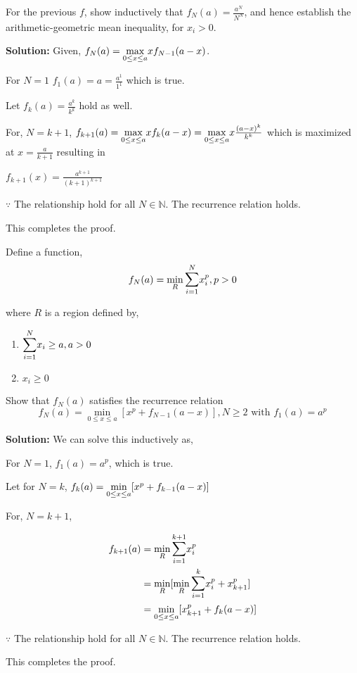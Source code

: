 \begin{example} For the previous $f$, show inductively that $f_N(a) = \frac{a^N}{N^N}$, and hence establish the arithmetic-geometric mean inequality, for $x_i > 0$.

\vspace{5mm}
\textbf{Solution:} Given, $f_N(a) = \mathlarger{\max_{0 \le x \le a}} xf_{N-1}(a-x)$.

For $N=1$ $f_1(a) = a = \frac{a^1}{1^1}$ which is true.

Let $f_k(a) = \frac{a^k}{k^k}$ hold as well.

For, $N=k+1$, $f_{k+1}(a) = \mathlarger{\max_{0 \le x \le a}} xf_{k}(a-x) = \mathlarger{\max_{0 \le x \le a}} x\frac{(a-x)^k}{k^k}$ which is maximized at $x=\frac{a}{k+1}$ resulting in 

$f_{k+1}(x) = \frac{a^{k+1}}{(k+1)^{k+1}}$

$\because$ The relationship hold for all $N \in \mathbb{N}$. The recurrence relation holds.

This completes the proof.
\end{example}

\begin{example}
Define a function,
$$
f_N(a) = \min_{R} \bigsum_{i=1}^N x_i^p, p>0
$$

where $R$ is a region defined by, 
\begin{enumerate}
    \item $\bigsum_{i=1}^N x_i \ge a, a > 0$
    \item $x_i \ge 0$
\end{enumerate}

Show that $f_N(a)$ satisfies the recurrence relation
$$
f_N(a) = \min_{0\le x \le a} [x^p + f_{N-1}(a-x)], N \ge 2 \text{ with } f_1(a) = a^p
$$

\vspace{5mm}
\textbf{Solution:} We can solve this inductively as, 

For $N=1$, $f_1(a) = a^p$, which is true.

Let for $N=k$, $f_k(a) = \mathlarger{\min_{0\le x \le a}} [x^p + f_{k-1}(a-x)]$

For, $N=k+1$,

\begin{align*}
    f_{k+1}(a) &= \min_{R} \bigsum_{i=1}^{k+1} x_i^p \\
               &= \min_{R} [\min_{R} \bigsum_{i=1}^{k} x_i^p + x_{k+1}^p] \\
               &= \min_{0\le x \le a} [x_{k+1}^p + f_{k}(a-x)]
\end{align*}

$\because$ The relationship hold for all $N \in \mathbb{N}$. The recurrence relation holds.

This completes the proof.
\end{example}

